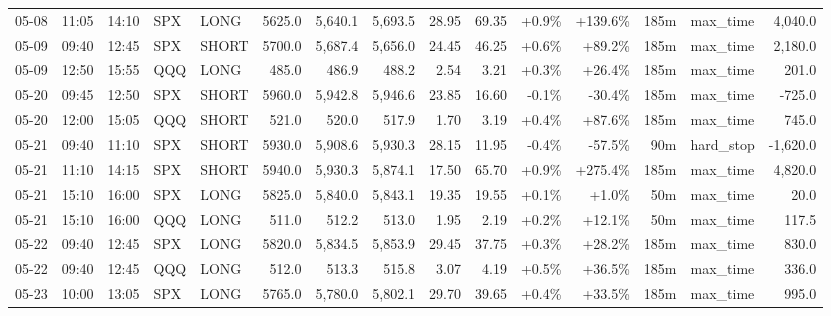 \documentclass[11pt,a4paper,twoside]{article}
\begin{document}
\begin{landscape}
\begin{center}
\begin{longtable}{>{\color{txtmain}}l l l l l r r r r r r r r >{\color{txtmain}}l r}
05-08 & 11:05 & 14:10 & SPX & LONG & 5625.0 & 5,640.1 & 5,693.5 & 28.95 & 69.35 & \textcolor{wingreen}{+0.9\%} & \textcolor{wingreen}{+139.6\%} & 185m & max\_time & \textcolor{wingreen}{4,040.0} \\
05-09 & 09:40 & 12:45 & SPX & SHORT & 5700.0 & 5,687.4 & 5,656.0 & 24.45 & 46.25 & \textcolor{wingreen}{+0.6\%} & \textcolor{wingreen}{+89.2\%} & 185m & max\_time & \textcolor{wingreen}{2,180.0} \\
05-09 & 12:50 & 15:55 & QQQ & LONG & 485.0 & 486.9 & 488.2 & 2.54 & 3.21 & \textcolor{wingreen}{+0.3\%} & \textcolor{wingreen}{+26.4\%} & 185m & max\_time & \textcolor{wingreen}{201.0} \\
05-20 & 09:45 & 12:50 & SPX & SHORT & 5960.0 & 5,942.8 & 5,946.6 & 23.85 & 16.60 & \textcolor{lossred}{-0.1\%} & \textcolor{lossred}{-30.4\%} & 185m & max\_time & \textcolor{lossred}{-725.0} \\
05-20 & 12:00 & 15:05 & QQQ & SHORT & 521.0 & 520.0 & 517.9 & 1.70 & 3.19 & \textcolor{wingreen}{+0.4\%} & \textcolor{wingreen}{+87.6\%} & 185m & max\_time & \textcolor{wingreen}{745.0} \\
05-21 & 09:40 & 11:10 & SPX & SHORT & 5930.0 & 5,908.6 & 5,930.3 & 28.15 & 11.95 & \textcolor{lossred}{-0.4\%} & \textcolor{lossred}{-57.5\%} & 90m & hard\_stop & \textcolor{lossred}{-1,620.0} \\
05-21 & 11:10 & 14:15 & SPX & SHORT & 5940.0 & 5,930.3 & 5,874.1 & 17.50 & 65.70 & \textcolor{wingreen}{+0.9\%} & \textcolor{wingreen}{+275.4\%} & 185m & max\_time & \textcolor{wingreen}{4,820.0} \\
05-21 & 15:10 & 16:00 & SPX & LONG & 5825.0 & 5,840.0 & 5,843.1 & 19.35 & 19.55 & \textcolor{wingreen}{+0.1\%} & \textcolor{wingreen}{+1.0\%} & 50m & max\_time & \textcolor{wingreen}{20.0} \\
05-21 & 15:10 & 16:00 & QQQ & LONG & 511.0 & 512.2 & 513.0 & 1.95 & 2.19 & \textcolor{wingreen}{+0.2\%} & \textcolor{wingreen}{+12.1\%} & 50m & max\_time & \textcolor{wingreen}{117.5} \\
05-22 & 09:40 & 12:45 & SPX & LONG & 5820.0 & 5,834.5 & 5,853.9 & 29.45 & 37.75 & \textcolor{wingreen}{+0.3\%} & \textcolor{wingreen}{+28.2\%} & 185m & max\_time & \textcolor{wingreen}{830.0} \\
05-22 & 09:40 & 12:45 & QQQ & LONG & 512.0 & 513.3 & 515.8 & 3.07 & 4.19 & \textcolor{wingreen}{+0.5\%} & \textcolor{wingreen}{+36.5\%} & 185m & max\_time & \textcolor{wingreen}{336.0} \\
05-23 & 10:00 & 13:05 & SPX & LONG & 5765.0 & 5,780.0 & 5,802.1 & 29.70 & 39.65 & \textcolor{wingreen}{+0.4\%} & \textcolor{wingreen}{+33.5\%} & 185m & max\_time & \textcolor{wingreen}{995.0} \\

\end{longtable}
\end{center}
\end{landscape}
\end{document}
